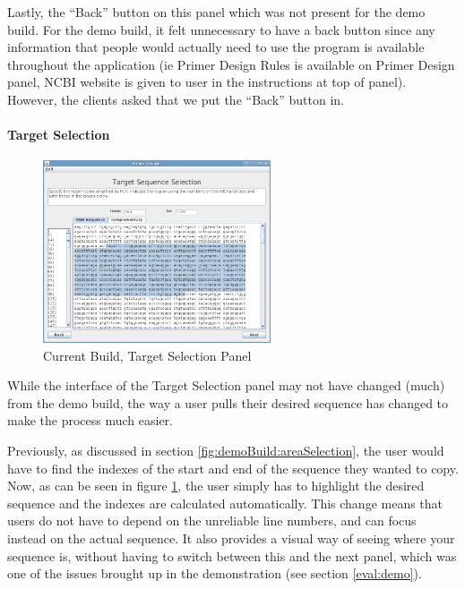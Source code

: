 Lastly, the ``Back'' button on this panel which was not present for
the demo build.
For the demo build, it felt unnecessary to have a back button since
any information that people would actually need to use the program is
available throughout the application (ie Primer Design Rules is
available on Primer Design panel, NCBI website is given to user in the
instructions at top of panel).
However, the clients asked that we put the ``Back'' button in.

\paragraph{Target Selection}

\begin{figure}[h]
  \begin{center}
    \includegraphics[width=0.6\textwidth]{./images/currentBuild/areaSelection.png}
    \caption{
      \label{fig:currentBuild:areaSelection}
      Current Build, Target Selection Panel
    }
  \end{center}
\end{figure}

While the interface of the Target Selection panel may not have changed
(much) from the demo build, the way a user pulls their desired
sequence has changed to make the process much easier.

Previously, as discussed in section \ref{fig:demoBuild:areaSelection},
the user would have to find the indexes of the start and end of the
sequence they wanted to copy.
Now, as can be seen in figure \ref{fig:currentBuild:areaSelection},
the user simply has to highlight the desired sequence and the indexes
are calculated automatically.
This change means that users do not have to depend on the unreliable
line numbers, and can focus instead on the actual sequence.
It also provides a visual way of seeing where your sequence is,
without having to switch between this and the next panel, which was
one of the issues brought up in the demonstration (see section
\ref{eval:demo}).

